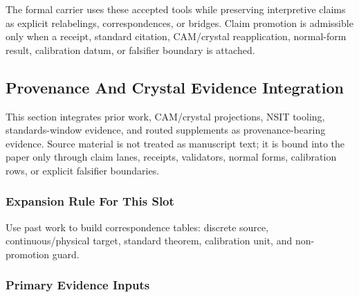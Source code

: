 \documentclass[11pt]{article}
\begin{document}
The formal carrier uses these accepted tools while preserving interpretive
claims as explicit relabelings, correspondences, or bridges. Claim promotion is admissible only when a receipt, standard citation,
CAM/crystal reapplication, normal-form result, calibration datum, or falsifier
boundary is attached.

\subsection*{Provenance And Crystal Evidence Integration}

This section integrates prior work, CAM/crystal projections, NSIT tooling,
standards-window evidence, and routed supplements as provenance-bearing
evidence. Source material is not treated as manuscript text; it is bound into
the paper only through claim lanes, receipts, validators, normal forms,
calibration rows, or explicit falsifier boundaries.

\subsubsection*{Expansion Rule For This Slot}

Use past work to build correspondence tables: discrete source, continuous/physical target, standard theorem, calibration unit, and non-promotion guard.

\subsubsection*{Primary Evidence Inputs}
\end{document}

